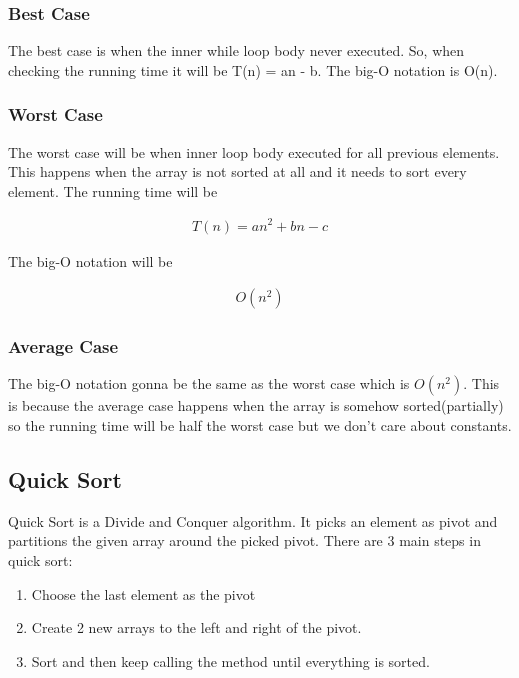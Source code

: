 \documentclass{article}
\begin{document}
\subsubsection{Best Case}
The best case is when the inner while loop body never executed. So, when checking the running time it will be T(n) = an - b. The big-O notation is O(n).
\newline
\newline
\newline

\subsubsection{Worst Case}
The worst case will be when inner loop body executed for all previous elements. This happens when the array is not sorted at all and it needs to sort every element. The running time will be
\begin{ceqn}
\begin{align}
   T(n) = an^2 + bn - c
\end{align}
\end{ceqn}
The big-O notation will be

\begin{ceqn}
\begin{align}
   O(n^2)
\end{align}
\end{ceqn}
\subsubsection{Average Case}
The big-O notation gonna be the same as the worst case which is $O(n^2)$. This is because the average case happens when the array is somehow sorted(partially) so the running time will be half the worst case but we don't care about constants.
\newline
\newline
\newline
\subsection{Quick Sort}
Quick Sort is a Divide and Conquer algorithm. It picks an element as pivot and partitions the given array around the picked pivot. There are 3 main steps in quick sort:
\begin{enumerate}
\item Choose the last element as the pivot
\item Create 2 new arrays to the left and right of the pivot.
\item Sort and then keep calling the method until everything is sorted.
\end{enumerate}
\end{document}
